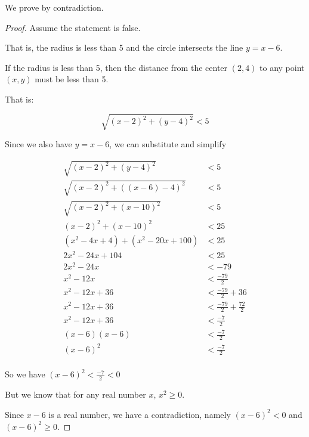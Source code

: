 \documentclass[12pt,letterpaper]{article}
\begin{document}
\begin{enumerate}
\begin{enumerate}
\begin{enumerate}
              We prove by contradiction.

              \begin{proof}
                Assume the statement is false.

                That is,
                the radius is less than 5 and the circle intersects the line $y = x - 6$.

                If the radius is less than 5,
                then the distance from the center $(2, 4)$ to any point $(x, y)$ must be less than 5.

                That is:

                \[
                  \sqrt{(x - 2)^2 + (y - 4)^2} < 5
                \]

                Since we also have $y = x - 6$, we can substitute and simplify

                \begin{align*}
                  \sqrt{(x - 2)^2 + (y - 4)^2} &< 5 \\
                  \sqrt{(x - 2)^2 + ((x - 6) - 4)^2} &< 5 \\
                  \sqrt{(x - 2)^2 + (x - 10)^2} &< 5 \\
                  (x - 2)^2 + (x - 10)^2 &< 25 \\
                  (x^2 - 4x + 4) + (x^2 - 20x + 100) &< 25 \\
                  2x^2 - 24x + 104 &< 25 \\
                  2x^2 - 24x &< -79 \\
                  x^2 - 12x &< \frac{-79}{2} \\
                  x^2 - 12x + 36 &< \frac{-79}{2} + 36 \\
                  x^2 - 12x + 36 &< \frac{-79}{2} + \frac{72}{2} \\
                  x^2 - 12x + 36 &< \frac{-7}{2} \\
                  (x - 6)(x - 6) &< \frac{-7}{2} \\
                  (x - 6)^2 &< \frac{-7}{2} \\
                \end{align*}

                So we have $(x - 6)^2 < \frac{-7}{2} < 0$

                But we know that for any real number $x$, $x^2 \geq 0$.

                Since $x - 6$ is a real number, we have a contradiction,
                namely $(x - 6)^2 < 0$ and $(x - 6)^2 \geq 0$.


\end{proof}
\end{enumerate}
\end{enumerate}
\end{enumerate}
\end{document}
